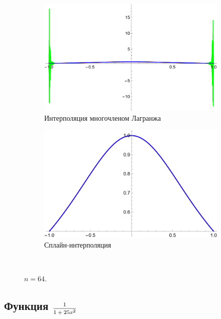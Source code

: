 \documentclass[12pt, a4paper]{article}
\begin{document}
	
	\begin{figure}[H]
		\centering
		\begin{subfigure}{0.4\textwidth}
			\includegraphics[width=\textwidth]{2_l64}
			\caption{Интерполяция многочленом Лагранжа}
		\end{subfigure}
		\hfill
		\begin{subfigure}{0.4\textwidth}
			\includegraphics[width=\textwidth]{2_s64}
			\caption{Сплайн-интерполяция}
		\end{subfigure}
		\hfill
		\\[0.5cm]
		\caption{$n = 64$.}
	\end{figure}
	
	\subsection{Функция $\hbox{\footnotesize$\displaystyle\frac{1}{1+25x^2}$}$}
	
\end{document}
